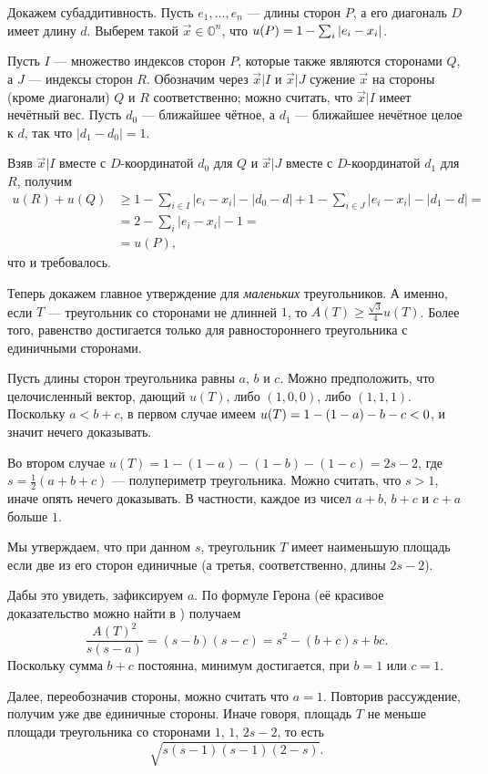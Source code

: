Докажем субаддитивность.
Пусть  $e_1,\dots,e_n$ --- длины сторон $P$, а его диагональ $D$ имеет длину $d$. 
Выберем такой $\vec x\in\mathbb{O}^n$, что $u(P)\z=1-\sum_i |e_i-x_i|$.

Пусть $I$ --- множество индексов сторон $P$, которые также являются сторонами $Q$, а $J$ --- индексы сторон $R$.
Обозначим через $\vec x|I$ и $\vec x|J$ сужение $\vec x$ на стороны (кроме диагонали) $Q$ и $R$ соответственно;
можно считать, что $\vec x|I$ имеет нечётный вес.
Пусть $d_0$ --- ближайшее чётное, а $d_1$ --- ближайшее нечётное целое к $d$, так что $|d_1-d_0|=1$.

Взяв $\vec x|I$ вместе с $D$-координатой $d_0$ для $Q$ и 
$\vec x|J$ вместе с $D$-координатой $d_1$ для $R$, получим
\begin{align*}
u(R)+u(Q)
&\geqslant
1-\sum_{i\in I}|e_i-x_i|-|d_0-d|
+
1-\sum_{i\in J}|e_i-x_i|-|d_1-d|
=
\\
&=
2-\sum_{i}|e_i-x_i|-1=
\\
&=u(P),
\end{align*}
что и требовалось.

Теперь докажем главное утверждение для \emph{маленьких} треугольников.
А именно, если $T$ --- треугольник со сторонами не длинней $1$, то 
$A(T)\geqslant \tfrac{\sqrt{3}}{4}u(T)$.
Более того, равенство достигается только для равностороннего треугольника с единичными сторонами.

Пусть длины сторон треугольника равны $a$, $b$ и $c$.
Можно предположить, что целочисленный вектор, дающий $u(T)$, либо $(1, 0, 0)$, либо $(1, 1, 1)$.
Поскольку $a < b + c$, в первом случае имеем $u(T)\z=1-(1-a)-b-c<0$, и значит нечего доказывать.

Во втором случае
$u(T)=1-(1-a)-(1-b)-(1-c)=2s-2$, где $s=\tfrac12(a+b+c)$ --- полупериметр треугольника.
Можно считать, что $s > 1$, иначе опять нечего доказывать.
В частности, каждое из чисел $a+b$, $b+c$ и $c+a$ больше $1$.

Мы утверждаем, что при данном $s$, треугольник $T$ имеет наименьшую площадь если две из его сторон единичные (а третья, соответственно, длины $2s - 2$).

Дабы это увидеть, зафиксируем $a$. 
По формуле Герона (её красивое доказательство можно найти в \cite{39}) получаем
\[\frac{A(T)^2}{s(s-a)}=(s-b)(s-c)=s^2-(b+c)s+bc.\]
Поскольку сумма $b + c$ постоянна, минимум достигается, при $b = 1$ или $c = 1$.

Далее, переобозначив стороны, можно считать что $a = 1$.
Повторив рассуждение, получим уже две единичные стороны.
Иначе говоря, площадь $T$ не меньше площади треугольника со сторонами $1$, $1$, $2s - 2$, то есть \[\sqrt{s(s-1)(s-1)(2-s)}.\]

